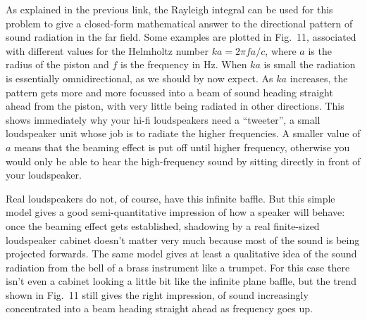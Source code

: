 
  As explained in the previous link, the Rayleigh integral can be used for this 
  problem to give a closed-form mathematical answer to the directional pattern 
  of sound radiation in the far field. Some examples are plotted in Fig.\ 11, 
  associated with different values for the Helmholtz number $ka=2 \pi f a/c$, 
  where $a$ is the radius of the piston and $f$ is the frequency in Hz. When 
  $ka$ is small the radiation is essentially omnidirectional, as we should by 
  now expect. As $ka$ increases, the pattern gets more and more focussed into a 
  beam of sound heading straight ahead from the piston, with very little being 
  radiated in other directions. This shows immediately why your hi-fi 
  loudspeakers need a ``tweeter'', a small loudspeaker unit whose job is to 
  radiate the higher frequencies. A smaller value of $a$ means that the beaming 
  effect is put off until higher frequency, otherwise you would only be able to 
  hear the high-frequency sound by sitting directly in front of your 
  loudspeaker. 


  Real loudspeakers do not, of course, have this infinite baffle. But this 
  simple model gives a good semi-quantitative impression of how a speaker will 
  behave: once the beaming effect gets established, shadowing by a real 
  finite-sized loudspeaker cabinet doesn't matter very much because most of the 
  sound is being projected forwards. The same model gives at least a 
  qualitative idea of the sound radiation from the bell of a brass instrument 
  like a trumpet. For this case there isn't even a cabinet looking a little bit 
  like the infinite plane baffle, but the trend shown in Fig.\ 11 still gives 
  the right impression, of sound increasingly concentrated into a beam heading 
  straight ahead as frequency goes up. 

